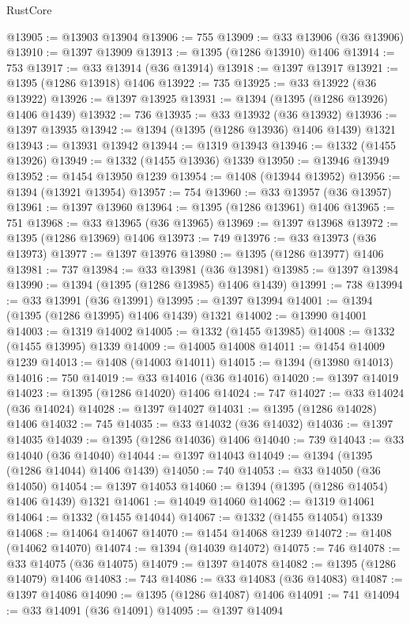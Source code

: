 \begin{lexlean}{RustCore}
\begin{coremodule}
@13905 := @13903 @13904
@13906 := 755
@13909 := @33 @13906 (@36 @13906)
@13910 := @1397 @13909
@13913 := @1395 (@1286 @13910) @1406
@13914 := 753
@13917 := @33 @13914 (@36 @13914)
@13918 := @1397 @13917
@13921 := @1395 (@1286 @13918) @1406
@13922 := 735
@13925 := @33 @13922 (@36 @13922)
@13926 := @1397 @13925
@13931 := @1394 (@1395 (@1286 @13926) @1406 @1439)
@13932 := 736
@13935 := @33 @13932 (@36 @13932)
@13936 := @1397 @13935
@13942 := @1394 (@1395 (@1286 @13936) @1406 @1439) @1321
@13943 := @13931 @13942
@13944 := @1319 @13943
@13946 := @1332 (@1455 @13926)
@13949 := @1332 (@1455 @13936) @1339
@13950 := @13946 @13949
@13952 := @1454 @13950 @1239
@13954 := @1408 (@13944 @13952)
@13956 := @1394 (@13921 @13954)
@13957 := 754
@13960 := @33 @13957 (@36 @13957)
@13961 := @1397 @13960
@13964 := @1395 (@1286 @13961) @1406
@13965 := 751
@13968 := @33 @13965 (@36 @13965)
@13969 := @1397 @13968
@13972 := @1395 (@1286 @13969) @1406
@13973 := 749
@13976 := @33 @13973 (@36 @13973)
@13977 := @1397 @13976
@13980 := @1395 (@1286 @13977) @1406
@13981 := 737
@13984 := @33 @13981 (@36 @13981)
@13985 := @1397 @13984
@13990 := @1394 (@1395 (@1286 @13985) @1406 @1439)
@13991 := 738
@13994 := @33 @13991 (@36 @13991)
@13995 := @1397 @13994
@14001 := @1394 (@1395 (@1286 @13995) @1406 @1439) @1321
@14002 := @13990 @14001
@14003 := @1319 @14002
@14005 := @1332 (@1455 @13985)
@14008 := @1332 (@1455 @13995) @1339
@14009 := @14005 @14008
@14011 := @1454 @14009 @1239
@14013 := @1408 (@14003 @14011)
@14015 := @1394 (@13980 @14013)
@14016 := 750
@14019 := @33 @14016 (@36 @14016)
@14020 := @1397 @14019
@14023 := @1395 (@1286 @14020) @1406
@14024 := 747
@14027 := @33 @14024 (@36 @14024)
@14028 := @1397 @14027
@14031 := @1395 (@1286 @14028) @1406
@14032 := 745
@14035 := @33 @14032 (@36 @14032)
@14036 := @1397 @14035
@14039 := @1395 (@1286 @14036) @1406
@14040 := 739
@14043 := @33 @14040 (@36 @14040)
@14044 := @1397 @14043
@14049 := @1394 (@1395 (@1286 @14044) @1406 @1439)
@14050 := 740
@14053 := @33 @14050 (@36 @14050)
@14054 := @1397 @14053
@14060 := @1394 (@1395 (@1286 @14054) @1406 @1439) @1321
@14061 := @14049 @14060
@14062 := @1319 @14061
@14064 := @1332 (@1455 @14044)
@14067 := @1332 (@1455 @14054) @1339
@14068 := @14064 @14067
@14070 := @1454 @14068 @1239
@14072 := @1408 (@14062 @14070)
@14074 := @1394 (@14039 @14072)
@14075 := 746
@14078 := @33 @14075 (@36 @14075)
@14079 := @1397 @14078
@14082 := @1395 (@1286 @14079) @1406
@14083 := 743
@14086 := @33 @14083 (@36 @14083)
@14087 := @1397 @14086
@14090 := @1395 (@1286 @14087) @1406
@14091 := 741
@14094 := @33 @14091 (@36 @14091)
@14095 := @1397 @14094

\end{coremodule}
\end{lexlean}
